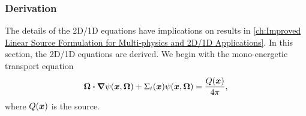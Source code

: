 {{{      \DeclareDocumentCommand{\aflux}{}{\psi}
      \DeclareDocumentCommand{\dir}{}{\vec{\Omega}}

      \subsubsection{Derivation}{\label{sssec:3T:Derivation}
        The details of the 2D/1D equations have implications on results in \cref{ch:Improved Linear Source Formulation for Multi-physics and 2D/1D Applications}.
        In this section, the 2D/1D equations are derived.
        We begin with the mono-energetic transport equation
        \begin{equation}\label{eq:2D/1D:Transport}
          \dir\vdot\grad\aflux(\loc,\dir) + \xst(\loc)\aflux(\loc,\dir) = \frac{Q(\loc)}{\fourpi},
        \end{equation}
        where $Q(\boldsymbol{x})$ is the source.

}}}}
